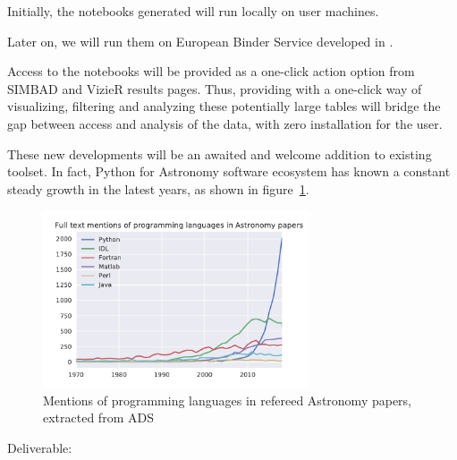 \begin{task}[
  title=Astronomy application,
  id=astro,
  lead=CDS,
  PM=18,
  wphases={0-48},
  partners={CDS}
]
  Initially, the notebooks generated will run locally on user
  machines.

  Later on, we will run them on European Binder Service developed in .

  Access to the notebooks will be provided as a one-click action option from
  SIMBAD and VizieR results pages.
  Thus, providing with a one-click way of visualizing, filtering and analyzing
these potentially large tables will bridge the gap between access and analysis
of the data, with zero installation for the user.

  These new developments will be an awaited and welcome addition to existing
  toolset. In fact, Python for Astronomy software ecosystem has known a constant
    steady growth in the latest years, as shown in figure~\ref{fig:python-astro-citations}.

  \begin{figure}[ht]\centering
  \includegraphics[width=0.7\textwidth]{python-astro-citations}
  \caption{Mentions of programming languages in refereed Astronomy papers, extracted from ADS}\label{fig:python-astro-citations}
\end{figure}

Deliverable: 




\end{task}
